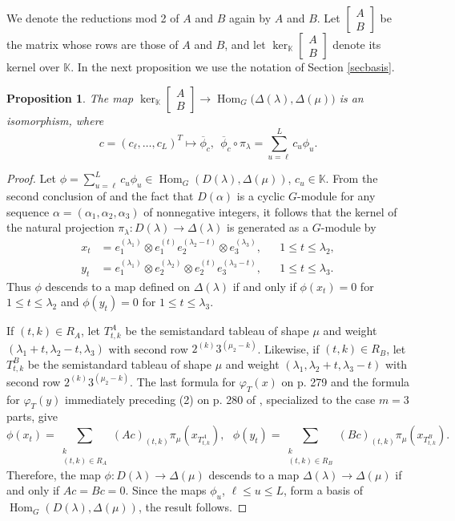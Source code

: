 \documentclass[11pt]{amsart}
\newtheorem{proposition}[theorem]{Proposition}
\theoremstyle{remark}
\theoremstyle{definition}
\newcommand{\Hom}{\operatorname{Hom}}
\newcommand{\D}{\Delta}
\newcommand{\la}{\lambda}
\newcommand{\K}{\mathbb K}
\numberwithin{equation}{section}
\begin{document}
We denote the reductions mod 2 of $A$ and $B$ again by $A$ and $B$. Let $\left[\begin{smallmatrix}A\\B\end{smallmatrix}\right]$ be the matrix whose rows are those of $A$ and $B$, and let $\ker_{\mathbb K}\left[\begin{smallmatrix}A\\B\end{smallmatrix}\right]$ denote its kernel over $\K$.
In the next proposition we use the notation of Section \ref{secbasis}. \begin{proposition}\label{keriso} The map $
	\ker_{\K}\left[\begin{smallmatrix}A\\B\end{smallmatrix}\right]
	\to
	\Hom_G\bigl(\D(\la),\D(\mu)\bigr)
	$ is an isomorphism, where
\[
c=(c_\ell,\ldots,c_L)^T\mapsto\overline{\phi}_c,
\ \
\overline{\phi}_c\circ\pi_\la
=\sum_{u=\ell}^{L}c_u\phi_u.
\]\end{proposition}

\begin{proof}Let
$\phi=\sum_{u=\ell}^{L}c_u\phi_{u} \in \Hom_G(D(\la),\D(\mu))
$, $c_u \in \K$.
From the second conclusion of \cite[Theorem II.3.16]{ABW} and the fact that $D(\alpha)$ is a cyclic $G$-module for any sequence $\alpha=(\alpha_1, \alpha_2, \alpha_3)$ of nonnegative integers, it follows that the kernel of the natural projection $\pi_\la: D(\la) \to \D(\la)$ is generated as a $G$-module by
\[
\begin{aligned}
	x_t&=e_1^{(\la_1)}\otimes
	e_1^{(t)}e_2^{(\la_2-t)}\otimes e_3^{(\la_3)},
	&&1\le t\le\la_2,\\
	y_t&=e_1^{(\la_1)}\otimes
	e_2^{(\la_2)}\otimes e_2^{(t)}e_3^{(\la_3-t)},
	&&1\le t\le\la_3.
\end{aligned}
\]
Thus $\phi$ descends to a map defined on \(\Delta(\la)\) if and only if $\phi(x_t)=0$ for $1\le t\le\la_2$ and $\phi(y_t)=0$ for $1\le t\le\la_3$.

If $(t,k)\in R_A$, let $T^A_{t,k}$ be the semistandard tableau of shape $\mu$ and weight $(\la_1+t,\la_2-t,\la_3)$ with second row $2^{(k)}3^{(\mu_2-k)}$. Likewise, if $(t,k)\in R_B$, let $T^B_{t,k}$ be the semistandard tableau of shape $\mu$ and weight $(\la_1,\la_2+t,\la_3-t)$ with second row $2^{(k)}3^{(\mu_2-k)}$.  The last formula for $\varphi_T(x)$ on p. 279
and the formula for $\varphi_T(y)$ immediately
preceding (2) on p. 280 of \cite{MS},
specialized to the case $m=3$ parts, give
\[
	\phi(x_t)
	=\sum_{\substack{k\\(t,k)\in R_A}}
	(Ac)_{(t,k)}\pi_\mu(x_{T^A_{t,k}}),\ \ \
	\phi(y_t)
	=\sum_{\substack{k\\(t,k)\in R_B}}
	(Bc)_{(t,k)}\pi_\mu(x_{T^B_{t,k}}).
\]
Therefore, the map $\phi: D(\la) \to \D(\mu)$ descends to a map  $\D(\la) \to \D(\mu)$ if and only if $Ac=Bc=0$. Since the maps $\phi_{u}$, $\ell \le u \le L$, form a basis of $\Hom_G(D(\la),\D(\mu))$, the result follows. \end{proof}
\end{document}
